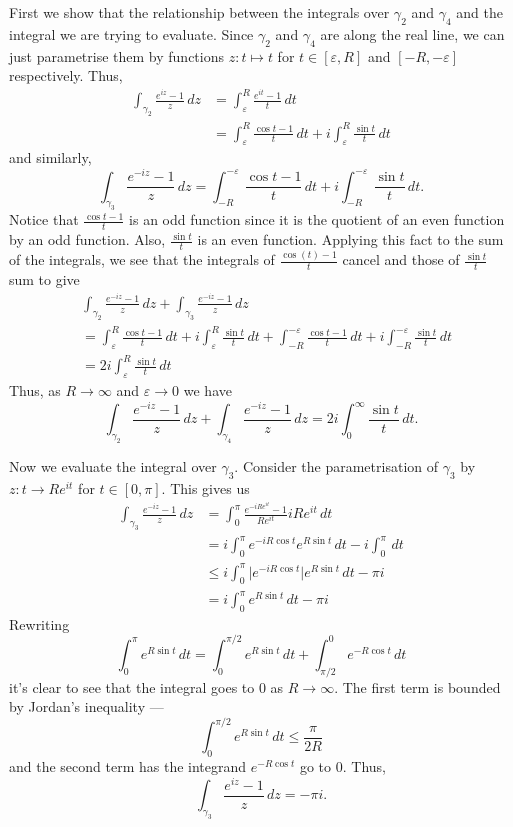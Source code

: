 \documentclass[12 pt, letterpaper]{hmcpset}
\begin{document}
\begin{solution}
	First we show that the relationship between the integrals over $\gamma_{2}$ and $\gamma_{4}$ and the integral we are trying to evaluate. Since $\gamma_{2}$ and $\gamma_{4}$ are along the real line, we can just parametrise them by functions $z : t \mapsto t$ for $t \in [\varepsilon, R]$ and $[-R, - \varepsilon]$ respectively. Thus,
	\[
		\begin{split}
			\int_{\gamma_{2}} \frac{e^{iz} - 1}{z} \, dz & = \int_{\varepsilon}^{R} \frac{e^{i t} - 1}{t} \, dt \\
								       & = \int_{\varepsilon}^{R} \frac{\cos{t} - 1}{t} \, dt + i \int_{\varepsilon}^{R} \frac{\sin{t}}{t} \, dt
		\end{split}
	\]
	and similarly,
	\[
		\int_{\gamma_{3}} \frac{e^{- i z} - 1}{z} \, dz = \int_{-R}^{- \varepsilon} \frac{\cos{t} - 1}{t} \, dt + i \int_{- R}^{- \varepsilon} \frac{\sin{t}}{t} \, dt.
	\]
	Notice that $\frac{\cos{t} - 1}{t}$ is an odd function since it is the quotient of an even function by an odd function. Also, $\frac{\sin{t}}{t}$ is an even function. Applying this fact to the sum of the integrals, we see that the integrals of $\frac{\cos{(t)} - 1}{t}$ cancel and those of $\frac{\sin{t}}{t}$ sum to give
	\[
		\begin{split}
			& \int_{\gamma_{2}} \frac{e^{- iz} - 1}{z} \, dz + \int_{\gamma_{3}} \frac{e^{-i z} - 1}{z} \, dz \\
			& = \int_{\varepsilon}^{R} \frac{\cos{t} - 1}{t} \, dt + i \int_{\varepsilon}^{R} \frac{\sin{t}}{t} \, dt + \int_{-R}^{- \varepsilon} \frac{\cos{t} - 1}{t} \, dt + i \int_{- R}^{- \varepsilon} \frac{\sin{t}}{t} \, dt \\
			& = 2i \int_{\varepsilon}^{R} \frac{\sin{t}}{t} \, dt 
		\end{split}
	\]
	Thus, as $R \to \infty$ and $\varepsilon \to 0$ we have
	\[
		\int_{\gamma_{2}} \frac{e^{-i z} - 1}{z} \, dz + \int_{\gamma_{4}} \frac{e^{-i z} - 1}{z} \, dz = 2i \int_{0}^{\infty} \frac{\sin{t}}{t} \, dt.
	\]

	Now we evaluate the integral over $\gamma_{3}$. Consider the parametrisation of $\gamma_{3}$ by $z : t \to R e^{i t}$ for $t \in [0, \pi]$. This gives us
	\[
		\begin{split}
			\int_{\gamma_{3}} \frac{e^{- i z} - 1}{z} \, dz & = \int_{0}^{\pi} \frac{e^{- i R e^{i t}}- 1}{R e^{i t}} i R e^{i t} \, dt \\
									& = i \int_{0}^{\pi} e^{- i R \cos{t}} e^{R \sin{t}} \, dt - i \int_{0}^{\pi}  \, dt \\
									& \le i \int_{0}^{\pi} \lvert e^{-i R \cos{t}} \rvert e^{R \sin{t}} \, dt - \pi i \\
									& = i \int_{0}^{\pi} e^{R \sin{t}} \, dt - \pi i 
		\end{split}
	\]
	Rewriting
	\[
		\int_{0}^{\pi} e^{R \sin{t}} \, dt = \int_{0}^{\pi /2} e^{R \sin{t}} \, dt + \int_{\pi/2}^{0} e^{- R \cos{t}} \, dt 
	\]
	it's clear to see that the integral goes to $0$ as $R \to \infty$. The first term is bounded by Jordan's inequality ---
	\[
		\int_{0}^{\pi/2} e^{R \sin{t}} \, dt \le \frac{\pi}{2 R}
	\]
	and the second term has the integrand $e^{- R \cos{t}}$ go to $0$. Thus,
	\[
		\int_{\gamma_{3}} \frac{e^{i z} - 1}{z} \, dz = - \pi i.
	\]


\end{solution}
\end{document}
